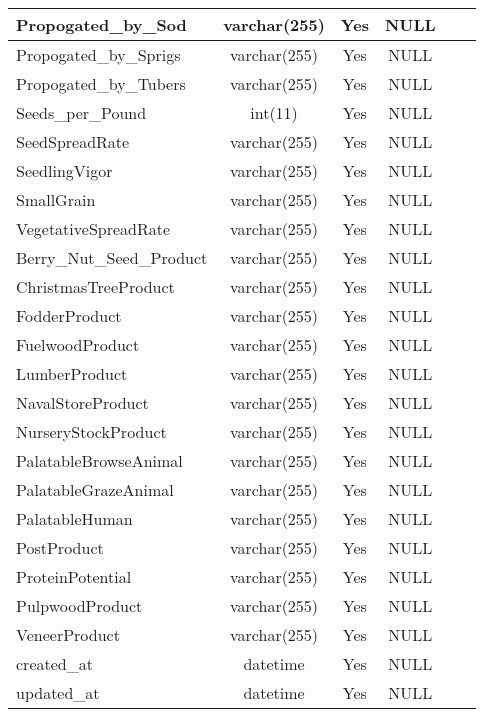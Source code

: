 \begin{enumerate}
\begin{longtable}{|l|c|c|c|l|l|}
Propogated\_by\_Sod & varchar(255) & Yes & NULL &  &  \\ \hline 
Propogated\_by\_Sprigs & varchar(255) & Yes & NULL &  &  \\ \hline 
Propogated\_by\_Tubers & varchar(255) & Yes & NULL &  &  \\ \hline 
Seeds\_per\_Pound & int(11) & Yes & NULL &  &  \\ \hline 
SeedSpreadRate & varchar(255) & Yes & NULL &  &  \\ \hline 
SeedlingVigor & varchar(255) & Yes & NULL &  &  \\ \hline 
SmallGrain & varchar(255) & Yes & NULL &  &  \\ \hline 
VegetativeSpreadRate & varchar(255) & Yes & NULL &  &  \\ \hline 
Berry\_Nut\_Seed\_Product & varchar(255) & Yes & NULL &  &  \\ \hline 
ChristmasTreeProduct & varchar(255) & Yes & NULL &  &  \\ \hline 
FodderProduct & varchar(255) & Yes & NULL &  &  \\ \hline 
FuelwoodProduct & varchar(255) & Yes & NULL &  &  \\ \hline 
LumberProduct & varchar(255) & Yes & NULL &  &  \\ \hline 
NavalStoreProduct & varchar(255) & Yes & NULL &  &  \\ \hline 
NurseryStockProduct & varchar(255) & Yes & NULL &  &  \\ \hline 
PalatableBrowseAnimal & varchar(255) & Yes & NULL &  &  \\ \hline 
PalatableGrazeAnimal & varchar(255) & Yes & NULL &  &  \\ \hline 
PalatableHuman & varchar(255) & Yes & NULL &  &  \\ \hline 
PostProduct & varchar(255) & Yes & NULL &  &  \\ \hline 
ProteinPotential & varchar(255) & Yes & NULL &  &  \\ \hline 
PulpwoodProduct & varchar(255) & Yes & NULL &  &  \\ \hline 
VeneerProduct & varchar(255) & Yes & NULL &  &  \\ \hline 
created\_at & datetime & Yes & NULL &  &  \\ \hline 
updated\_at & datetime & Yes & NULL &  &  \\ \hline 
 \end{longtable}


\end{enumerate}
